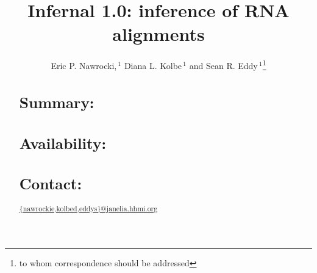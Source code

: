 \documentclass{bioinfo}
\begin{document}

\begin{application}

\title[Infernal 1.0]{Infernal 1.0: inference of RNA alignments}
\author[E. Nawrocki, D. Kolbe and S. Eddy]{Eric P. Nawrocki,\,$^1$ Diana L. Kolbe\,$^1$ and Sean R. Eddy\,$^1$\footnote{to whom correspondence should be addressed}}
\address{$^{1}$HHMI Janelia Farm Research Campus, Ashburn VA 20147, USA\\}



\maketitle

\begin{abstract}
\section{Summary:}

\section{Availability:}

\section{Contact:} \url{{nawrockie,kolbed,eddys}@janelia.hhmi.org}
\end{abstract}

\end{application}
\end{document}
